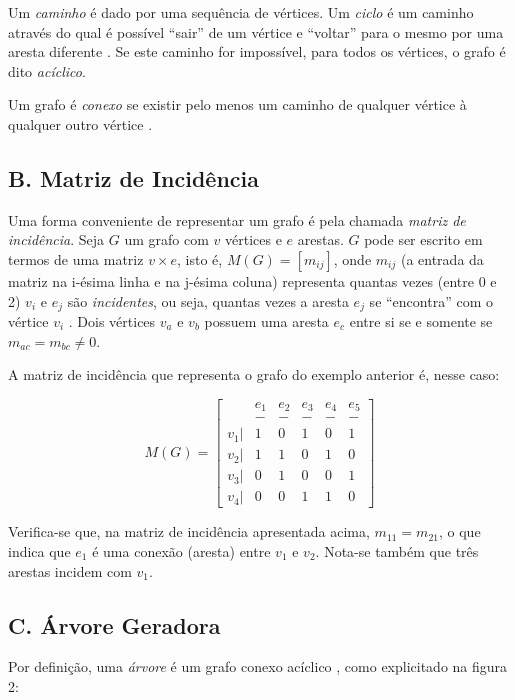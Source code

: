 \documentclass[twocolumn, 10pt]{extarticle}
\begin{document}
Um \textit{caminho} é dado por uma sequência de vértices. Um \textit{ciclo} é um caminho através do qual é possível ``sair'' de um vértice e ``voltar'' para o mesmo por uma aresta diferente \cite[p. 519]{sedgewick}. Se este caminho for impossível, para todos os vértices, o grafo é dito \textit{acíclico}.

Um grafo é \textit{conexo} se existir pelo menos um caminho de qualquer vértice à qualquer outro vértice \cite[p. 519]{sedgewick}.

\subsection*{B. \quad Matriz de Incidência}

Uma forma conveniente de representar um grafo é pela chamada \textit{matriz de incidência}. Seja $G$ um grafo com $v$ vértices e $e$ arestas. $G$ pode ser escrito em termos de uma matriz $v \times e$, isto é, $M(G) = [m_{ij}]$, onde $m_{ij}$ (a entrada da matriz na i-ésima linha e na j-ésima coluna) representa quantas vezes (entre 0 e 2) $v_i$ e $e_j$ são \textit{incidentes}, ou seja, quantas vezes a aresta $e_j$ se ``encontra'' com o vértice $v_i$ \cite[p. 7]{bondy}. Dois vértices $v_a$ e $v_b$ possuem uma aresta $e_c$ entre si se e somente se $m_{ac} = m_{bc} \neq 0$.

A matriz de incidência que representa o grafo do exemplo anterior é, nesse caso:

\[
M(G) = 
\begin{bmatrix}
 & e_1 & e_2 & e_3 & e_4 & e_5 \\
 & - & - & - & - & - \\
 v_1 |& 1 & 0 & 1 & 0 & 1\\
 v_2 |& 1 & 1 & 0 & 1 & 0\\
 v_3 |& 0 & 1 & 0 & 0 & 1\\
 v_4 |& 0 & 0 & 1 & 1 & 0
\end{bmatrix}
\]

Verifica-se que, na matriz de incidência apresentada acima, $m_{11} = m_{21}$, o que indica que $e_1$ é uma conexão (aresta) entre $v_1$ e $v_2$. Nota-se também que três arestas incidem com $v_1$. 

\subsection*{C. \quad Árvore Geradora}

Por definição, uma \textit{árvore} é um grafo conexo acíclico \cite[p. 520]{sedgewick}, como explicitado na figura 2:
\end{document}
